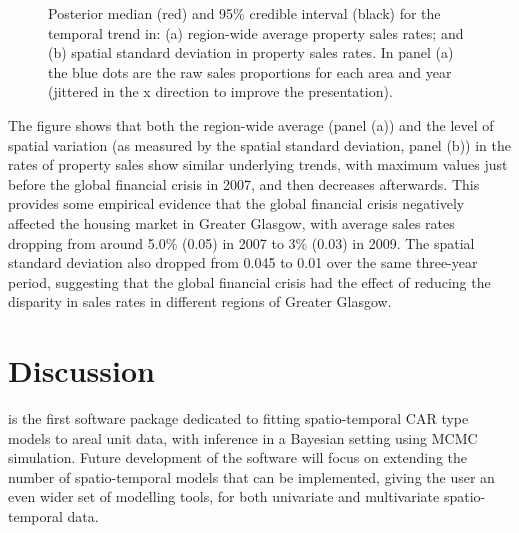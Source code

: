 \documentclass[article, nojss]{jss}
\begin{document}
\begin{figure}
\centering 
{}
\caption{Posterior median (red) and 95\% credible interval (black) for the temporal trend in: (a) region-wide average property sales rates; and (b) spatial standard deviation in property sales rates. In panel (a) the blue dots are the raw sales proportions for each area and year (jittered in the x direction to improve the presentation).\label{salestrend}}
\end{figure} 

The figure shows that both the region-wide average (panel (a)) and the level of spatial variation (as measured by the spatial standard deviation, panel (b)) in the rates of property sales show similar underlying trends, with maximum values just before the global financial crisis in 2007, and then  decreases afterwards. This provides some empirical evidence that the global financial crisis negatively affected the housing market in Greater Glasgow, with average sales rates dropping from around 5.0\% (0.05) in 2007 to 3\% (0.03) in 2009. The spatial standard deviation also dropped from 0.045 to 0.01 over the same three-year period, suggesting that the global financial crisis had the effect of reducing the disparity in sales rates in different regions of Greater Glasgow.




\section{Discussion}\label{section7}
 is the first software package dedicated to fitting spatio-temporal CAR type models to areal unit data, with inference in a Bayesian setting using MCMC simulation. Future development of the software will focus on extending the number of spatio-temporal models that can be implemented, giving the user an even wider set of modelling tools, for both univariate and multivariate spatio-temporal data. 
\end{document}
